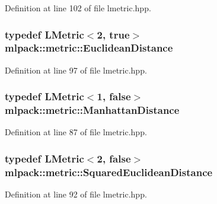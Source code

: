 Definition at line 102 of file lmetric.\-hpp.

\subsubsection[{Euclidean\-Distance}]{\setlength{\rightskip}{0pt plus 5cm}typedef {\bf L\-Metric}$<$2, true$>$ {\bf mlpack\-::metric\-::\-Euclidean\-Distance}}\label{namespacemlpack_1_1metric_a012695bde5dbf7ded7f7a180b5f3f512}


Definition at line 97 of file lmetric.\-hpp.

\subsubsection[{Manhattan\-Distance}]{\setlength{\rightskip}{0pt plus 5cm}typedef {\bf L\-Metric}$<$1, false$>$ {\bf mlpack\-::metric\-::\-Manhattan\-Distance}}\label{namespacemlpack_1_1metric_aa206bc9eea1ad29826b0bf9890e69aaf}


Definition at line 87 of file lmetric.\-hpp.

\subsubsection[{Squared\-Euclidean\-Distance}]{\setlength{\rightskip}{0pt plus 5cm}typedef {\bf L\-Metric}$<$2, false$>$ {\bf mlpack\-::metric\-::\-Squared\-Euclidean\-Distance}}\label{namespacemlpack_1_1metric_add19cf9fc6f452a0dad6635a93451be7}


Definition at line 92 of file lmetric.\-hpp.

